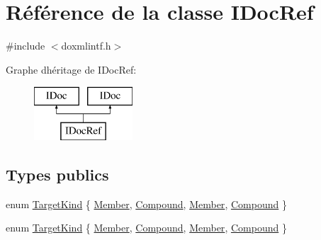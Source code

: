 \hypertarget{class_i_doc_ref}{}\section{Référence de la classe I\+Doc\+Ref}
\label{class_i_doc_ref}


{\ttfamily \#include $<$doxmlintf.\+h$>$}

Graphe d\textquotesingle{}héritage de I\+Doc\+Ref\+:\begin{figure}[H]
\begin{center}
\leavevmode
\includegraphics[height=2.000000cm]{class_i_doc_ref}
\end{center}
\end{figure}
\subsection*{Types publics}
\begin{DoxyCompactItemize}
\item 
enum \hyperlink{class_i_doc_ref_af94834302f9f23860d170dc0a8529c08}{Target\+Kind} \{ \hyperlink{class_i_doc_ref_af94834302f9f23860d170dc0a8529c08a3a33e7adc5a449883c986045a16aefd5}{Member}, 
\hyperlink{class_i_doc_ref_af94834302f9f23860d170dc0a8529c08a121b5fd45b6a1386e45267713be133b2}{Compound}, 
\hyperlink{class_i_doc_ref_af94834302f9f23860d170dc0a8529c08a3a33e7adc5a449883c986045a16aefd5}{Member}, 
\hyperlink{class_i_doc_ref_af94834302f9f23860d170dc0a8529c08a121b5fd45b6a1386e45267713be133b2}{Compound}
 \}
\item 
enum \hyperlink{class_i_doc_ref_af94834302f9f23860d170dc0a8529c08}{Target\+Kind} \{ \hyperlink{class_i_doc_ref_af94834302f9f23860d170dc0a8529c08a3a33e7adc5a449883c986045a16aefd5}{Member}, 
\hyperlink{class_i_doc_ref_af94834302f9f23860d170dc0a8529c08a121b5fd45b6a1386e45267713be133b2}{Compound}, 
\hyperlink{class_i_doc_ref_af94834302f9f23860d170dc0a8529c08a3a33e7adc5a449883c986045a16aefd5}{Member}, 
\hyperlink{class_i_doc_ref_af94834302f9f23860d170dc0a8529c08a121b5fd45b6a1386e45267713be133b2}{Compound}
 \}
\end{DoxyCompactItemize}
